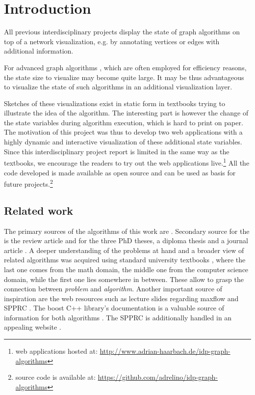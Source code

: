\chapter{Introduction}\label{ch:1}

All previous interdisciplinary projects \cite{storz2013idp,velden2014idp,sefidgar2015idp,becker2015idp,zoennchen2015idp,fischer2016idp,feil2016idp} display the state of graph algorithms on top of a network visualization, e.g. by annotating vertices or edges with additional information.

For advanced graph algorithms \cite{goldberg1988new,irnich2005shortest}, which are often employed for efficiency reasons, the state size to visualize may become quite large. It may be thus advantageous to visualize the state of such algorithms in an additional visualization layer. 

Sketches of these visualizations exist in static form in textbooks \cite{ahuja1993network,cormen2009introduction,jungnickel2013graphs} trying to illustrate the idea of the algorithm. The interesting part is however the change of the state variables during algorithm execution, which is hard to print on paper. The motivation of this project was thus to develop two web applications with a highly dynamic and interactive visualization of these additional state variables. Since this interdisciplinary project report is limited in the same way as the textbooks, we encourage the readers to try out the web applications live.\footnote{web applications hosted at: \url{http://www.adrian-haarbach.de/idp-graph-algorithms}} All the code developed is made available as open source and can be used as basis for future projects.\footnote{source code is available at: \url{https://github.com/adrelino/idp-graph-algorithms}}

\section{Related work}
The primary sources of the algorithms of this work are \cite{goldberg1988new,irnich2005shortest}. Secondary source for the \pushRelabel{} is the review article \cite{goldberg2014efficient} and for the  three PhD theses, a diploma thesis and a journal article \cite{solomon1983vehicle,ziegelmann2001constrained,schlechte2003resource,feillet2004exact,garcia2009resource}.
A deeper understanding of the problems at hand and a broader view of related algorithms was acquired using standard university textbooks \cite{ahuja1993network,cormen2009introduction,jungnickel2013graphs}, where the last one comes from the math domain, the middle one from the computer science domain, while the first one lies somewhere in between. These allow to grasp the connection between \textit{problem} and \textit{algorithm}.
Another important source of inspiration are the web resources such as lecture slides regarding maxflow \cite{mayer2013prakt,mehlhorn2000maximum,williamson2007network,matuschke2016network} and SPPRC \cite{petersen2006label}. The boost C++ library's documentation is a valuable source of information for both algorithms \cite{boost2002push,boost2006rc}. The SPPRC is additionally handled in an appealing website \cite{networking2013vehicle}. %

